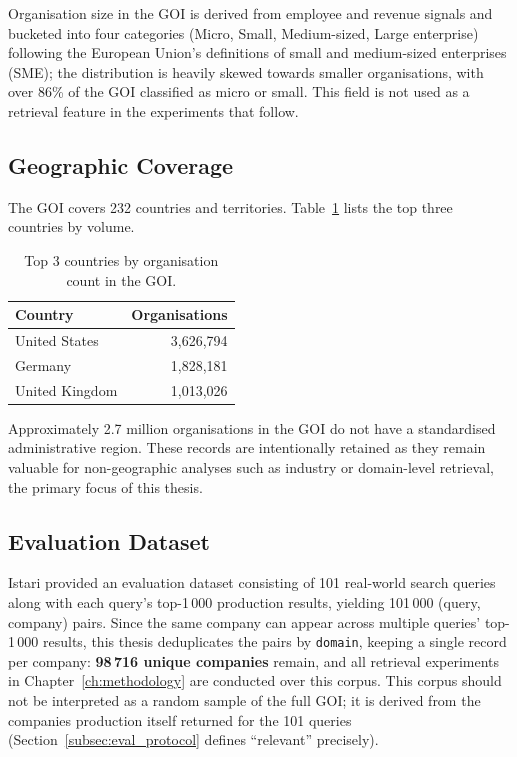 \documentclass[a4paper,oneside,bibliography=totoc]{scrbook}
\begin{document}
Organisation size in the GOI is derived from employee and revenue signals and bucketed into four categories (Micro, Small, Medium-sized, Large enterprise) following the European Union's definitions of small and medium-sized enterprises (SME); the distribution is heavily skewed towards smaller organisations, with over 86\% of the GOI classified as micro or small. This field is not used as a retrieval feature in the experiments that follow.

\subsection{Geographic Coverage}

The GOI covers 232 countries and territories. Table~\ref{tab:geo_top} lists the top three countries by volume.

\begin{table}[h]
\centering
\caption{Top 3 countries by organisation count in the GOI.}
\label{tab:geo_top}
\begin{tabular}{lr}
\toprule
\textbf{Country} & \textbf{Organisations} \\
\midrule
United States   & 3{,}626{,}794 \\
Germany         & 1{,}828{,}181 \\
United Kingdom  & 1{,}013{,}026 \\
\bottomrule
\end{tabular}
\end{table}

Approximately 2.7 million organisations in the GOI do not have a standardised administrative region. These records are intentionally retained as they remain valuable for non-geographic analyses such as industry or domain-level retrieval, the primary focus of this thesis.

\subsection{Evaluation Dataset}
\label{subsec:istari_eval_dataset}

Istari provided an evaluation dataset consisting of 101 real-world search queries along with each query's top-1\,000 production results, yielding 101\,000 (query, company) pairs. Since the same company can appear across multiple queries' top-1\,000 results, this thesis deduplicates the pairs by \texttt{domain}, keeping a single record per company: \textbf{98\,716 unique companies} remain, and all retrieval experiments in Chapter~\ref{ch:methodology} are conducted over this corpus. This corpus should not be interpreted as a random sample of the full GOI; it is derived from the companies production itself returned for the 101 queries (Section~\ref{subsec:eval_protocol} defines ``relevant'' precisely).
\end{document}
